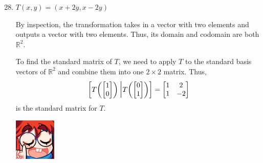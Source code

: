 \documentclass{article}
\begin{document}
\begin{enumerate}
    \setcounter{enumi}{27}
    \item \(T(x,y) = (x+2y, x-2y)\)\begin{solution}
        By inspection, the transformation takes in a vector with two elements and outputs a vector with two elements. Thus, its domain and codomain are both \(\mathbb{R}^2\).\par 
        To find the standard matrix of \(T\), we need to apply \(T\) to the standard basis vectors of \(\mathbb{R}^2\) and combine them into one \(2 \times 2\) matrix. Thus,\[
            \begin{bmatrix}
                T\!\begin{pmatrix}
                    \begin{bmatrix}
                        1\\0
                    \end{bmatrix}
                \end{pmatrix}\scalebox{1.3}{\Big|}T\!\begin{pmatrix}
                    \begin{bmatrix}
                        0\\1
                    \end{bmatrix}
                \end{pmatrix}
            \end{bmatrix} = \begin{bmatrix}
                1&2\\1&-2
            \end{bmatrix}
        \] is the standard matrix for \(T\).
    \end{solution}
    \begin{minipage}{.14\textwidth}
        \vspace{0pt}
        \includegraphics[width=2cm]{nerd_maddy.png}
    \end{minipage}%
\end{enumerate}
\end{document}
